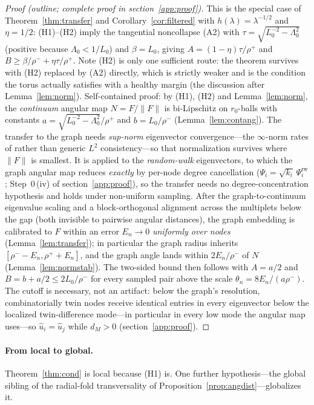 \documentclass[review]{siamart220329}
\begin{document}
\begin{proof}[Proof (outline; complete proof in section~\ref{app:proof})]
This is the special case of Theorem~\ref{thm:transfer} and
Corollary~\ref{cor:filtered} with $h(\lambda)=\lambda^{-1/2}$ and $\eta=1/2$:
(H1)--(H2) imply the tangential noncollapse (A2) with
$\tau=\sqrt{L_0^{-2}-\Lambda_0^2}$ (positive because $\Lambda_0<1/L_0$) and
$\beta=L_0$, giving $A=(1-\eta)\tau/\rho^+$ and
$B\ge\beta/\rho^-+\eta\tau/\rho^+$. Note (H2) is only one sufficient route:
the theorem survives with (H2) replaced by (A2) directly, which is strictly
weaker and is the condition the torus actually satisfies with a healthy
margin (the discussion after Lemma~\ref{lem:norm}). Self-contained proof:
by (H1), (H2) and Lemma~\ref{lem:norm}, the \emph{continuum} angular map
$N=F/\lVert F\rVert$ is bi-Lipschitz on $r_0$-balls with constants
$a=\sqrt{L_0^{-2}-\Lambda_0^2}/\rho^+$ and $b=L_0/\rho^-$
(Lemma~\ref{lem:contang}). The transfer to the graph needs \emph{sup-norm}
eigenvector convergence---the $\infty$-norm rates of \cite{calder2022} rather
than generic $L^2$ consistency---so that normalization survives where
$\lVert F\rVert$ is smallest. It is applied to the \emph{random-walk}
eigenvectors, to which the graph angular map reduces \emph{exactly} by per-node
degree cancellation ($\Psi_i=\sqrt{k_i}\,\Psi^{\mathrm{rw}}_i$; Step~0\,(iv) of
section~\ref{app:proof}), so the transfer needs no degree-concentration
hypothesis and holds under non-uniform sampling. After the graph-to-continuum
eigenvalue scaling
and a block-orthogonal alignment across the multiplets below the gap (both
invisible to pairwise angular distances), the graph embedding is calibrated to
$F$ within an error $E_n\to0$ \emph{uniformly over nodes}
(Lemma~\ref{lem:transfer}); in particular the graph radius inherits
$[\rho^--E_n,\rho^++E_n]$, and the graph angle lands within $2E_n/\rho^-$ of $N$
(Lemma~\ref{lem:normstab}). The two-sided bound then follows with $A=a/2$ and
$B=b+a/2\le2L_0/\rho^-$ for every sampled pair above the scale
$\theta_n=8E_n/(a\rho^-)$. The cutoff is necessary, not an artifact: below the
graph's resolution, combinatorially twin nodes receive identical entries in
every eigenvector below the localized twin-difference mode---in particular in
every low mode the angular map uses---so $\hat u_i=\hat u_j$ while $d_M>0$
(section~\ref{app:proof}).
\end{proof}

\paragraph{From local to global.} Theorem~\ref{thm:cond} is local because
(H1) is. One further hypothesis---the global sibling of the radial-fold
transversality of Proposition~\ref{prop:angdist}---globalizes it.
\end{document}

